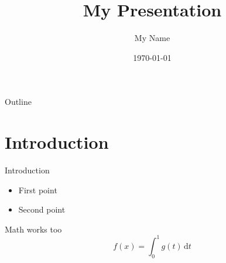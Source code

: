 \documentclass{beamer}
\title{My Presentation}
\author{My Name}
\date{\today}
\begin{document}
\begin{frame}
  \titlepage
\end{frame}

\begin{frame}{Outline}
  \tableofcontents
\end{frame}

\section{Introduction}

\begin{frame}{Introduction}
  \begin{itemize}
    \item First point
    \item Second point
  \end{itemize}
\end{frame}

\begin{frame}{Math works too}
  \[
    f(x) = \int_0^1 g(t)\,\mathrm{d}t
  \]
\end{frame}
\end{document}

